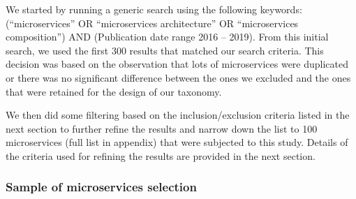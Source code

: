 \documentclass{article}
\begin{document}
We started by running a generic search using the following keywords: (“microservices” OR “microservices architecture” OR “microservices composition”) AND (Publication date range 2016 – 2019). From this initial search, we used the first 300 results that matched our search criteria. This decision was based on the observation that lots of microservices were duplicated or there was no significant difference between the ones we excluded and the ones that were retained for the design of our taxonomy.

We then did some filtering based on the inclusion/exclusion criteria listed in the next section to further refine the results and narrow down the list to 100 microservices (full list in appendix) that were subjected to this study. Details of the criteria used for refining the results are provided in the next section.

\subsubsection{Sample of microservices selection}
\end{document}
